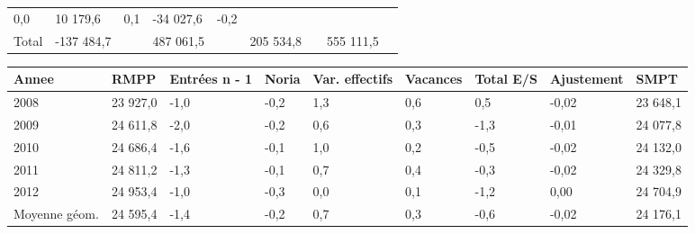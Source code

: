 \begin{longtable}[]{@{}lllllllll@{}}
\begin{minipage}[t]{0.06\columnwidth}
0,0\strut
\end{minipage} & \begin{minipage}[t]{0.12\columnwidth}\raggedright
10 179,6\strut
\end{minipage} & \begin{minipage}[t]{0.06\columnwidth}\raggedright
0,1\strut
\end{minipage} & \begin{minipage}[t]{0.08\columnwidth}\raggedright
-34 027,6\strut
\end{minipage} & \begin{minipage}[t]{0.06\columnwidth}\raggedright
-0,2\strut
\end{minipage}\tabularnewline
\begin{minipage}[t]{0.05\columnwidth}\raggedright
Total\strut
\end{minipage} & \begin{minipage}[t]{0.10\columnwidth}\raggedright
-137 484,7\strut
\end{minipage} & \begin{minipage}[t]{0.06\columnwidth}\raggedright
\strut
\end{minipage} & \begin{minipage}[t]{0.17\columnwidth}\raggedright
487 061,5\strut
\end{minipage} & \begin{minipage}[t]{0.06\columnwidth}\raggedright
\strut
\end{minipage} & \begin{minipage}[t]{0.12\columnwidth}\raggedright
205 534,8\strut
\end{minipage} & \begin{minipage}[t]{0.06\columnwidth}\raggedright
\strut
\end{minipage} & \begin{minipage}[t]{0.08\columnwidth}\raggedright
555 111,5\strut
\end{minipage} & \begin{minipage}[t]{0.06\columnwidth}\raggedright
\strut
\end{minipage}\tabularnewline
\bottomrule
\end{longtable}

\begin{longtable}[]{@{}lllllllll@{}}
\toprule
Annee & RMPP & Entrées n - 1 & Noria & Var. effectifs & Vacances & Total
E/S & Ajustement & SMPT\tabularnewline
\midrule
\endhead
2008 & 23 927,0 & -1,0 & -0,2 & 1,3 & 0,6 & 0,5 & -0,02 & 23
648,1\tabularnewline
2009 & 24 611,8 & -2,0 & -0,2 & 0,6 & 0,3 & -1,3 & -0,01 & 24
077,8\tabularnewline
2010 & 24 686,4 & -1,6 & -0,1 & 1,0 & 0,2 & -0,5 & -0,02 & 24
132,0\tabularnewline
2011 & 24 811,2 & -1,3 & -0,1 & 0,7 & 0,4 & -0,3 & -0,02 & 24
329,8\tabularnewline
2012 & 24 953,4 & -1,0 & -0,3 & 0,0 & 0,1 & -1,2 & 0,00 & 24
704,9\tabularnewline
Moyenne géom. & 24 595,4 & -1,4 & -0,2 & 0,7 & 0,3 & -0,6 & -0,02 & 24
176,1\tabularnewline
\bottomrule
\end{longtable}

